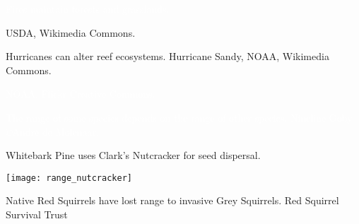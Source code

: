 \documentclass[t,handout]{beamer}  %
\begin{document}

{
\begin{frame}[b]{}

\end{frame}
}

{
\begin{frame}[b]{}

\end{frame}
}

%
{
\begin{frame}[b]{\textcolor{white}{Fires maintain forests and grasslands.}}

\end{frame}
}
%
{
\begin{frame}[b]
	\tiny\hfill USDA, Wikimedia Commons.
\end{frame}
}
%
{
\begin{frame}[b]{Hurricanes can alter reef ecosystems.}
	\tiny\hfill Hurricane Sandy, NOAA, Wikimedia Commons.
\end{frame}
}
%
{
\begin{frame}[b]
	\tiny\textcolor{white}{NOAA, Flickr Creative Commons.}
\end{frame}
}
%
{
\begin{frame}[b]{\textcolor{white}{The range of some species depends on the range of other species.}}
	\tiny\textcolor{white}{Nineline Goby, \copyright André de Molenaar.}
\end{frame}
}
%
\begin{frame}[t]{Whitebark Pine uses Clark’s Nutcracker for seed dispersal.}
	\begin{center}
		\texttt{[image: range\_nutcracker]}
	\end{center}
\end{frame}
%
{
\begin{frame}[b]{Native Red Squirrels have lost range to invasive Grey Squirrels.}	
	\tiny\hfill Red Squirrel Survival Trust
\end{frame}
}
\end{document}
